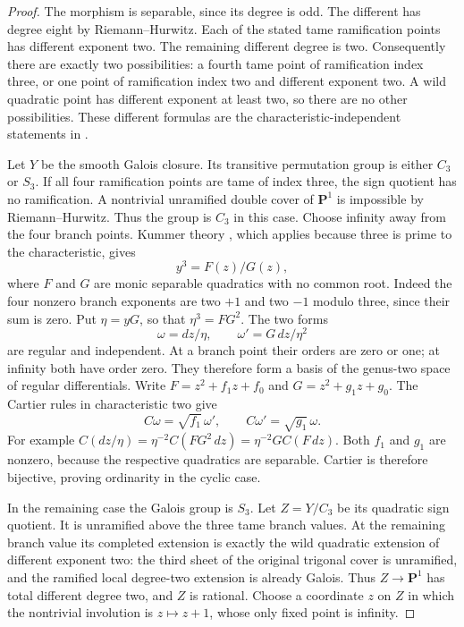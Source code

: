 \begin{proof}
The morphism is separable, since its degree is odd. The different has
degree eight by Riemann--Hurwitz. Each of the stated tame ramification
points has different exponent two. The remaining different degree is
two. Consequently there are exactly two possibilities: a fourth tame
point of ramification index three, or one point of ramification index
two and different exponent two. A wild quadratic point has different
exponent at least two, so there are no other possibilities.
These different formulas are the characteristic-independent statements
in \citet[Section~53.12, especially Lemmas~53.12.2 and~53.12.4]{Stacks0C1B}.

Let $Y$ be the smooth Galois closure. Its transitive permutation group
is either $C_3$ or $S_3$. If all four ramification points are tame of
index three, the sign quotient has no ramification. A nontrivial
unramified double cover of $\mathbf P^1$ is impossible by
Riemann--Hurwitz. Thus the group is $C_3$ in this case.
Choose infinity away from the four branch points. Kummer theory
\citep[Lemma~9.24.1, Tag~09DX]{Stacks09DX}, which applies because
three is prime to the characteristic, gives
\[
                   y^3=F(z)/G(z),
\]
where $F$ and $G$ are monic separable quadratics with no common root.
Indeed the four nonzero branch exponents are two $+1$ and two $-1$
modulo three, since their sum is zero. Put
$\eta=yG$, so that $\eta^3=FG^2$.
The two forms
\[
             \omega=dz/\eta,\qquad \omega'=G\,dz/\eta^2
\]
are regular and independent. At a branch point their orders are zero
or one; at infinity both have order zero. They therefore form a
basis of the genus-two space of regular differentials.
Write $F=z^2+f_1z+f_0$ and $G=z^2+g_1z+g_0$.
The Cartier rules in characteristic two give
\[
              C\omega=\sqrt{f_1}\,\omega',\qquad
              C\omega'=\sqrt{g_1}\,\omega.
\]
For example $C(dz/\eta)=\eta^{-2}C(FG^2\,dz)
=\eta^{-2}G C(F\,dz)$. Both $f_1$ and $g_1$ are nonzero,
because the respective quadratics are separable. Cartier is
therefore bijective, proving ordinarity in the cyclic case.

In the remaining case the Galois group is $S_3$. Let
$Z=Y/C_3$ be its quadratic sign quotient. It is unramified above the
three tame branch values. At the remaining branch value its completed
extension is exactly the wild quadratic extension of different
exponent two: the third sheet of the original trigonal cover is
unramified, and the ramified local degree-two extension is already
Galois. Thus $Z\to\mathbf P^1$ has total different degree two,
and $Z$ is rational. Choose a coordinate $z$ on $Z$ in which the
nontrivial involution is $z\mapsto z+1$, whose only fixed point is
infinity.


\end{proof}
